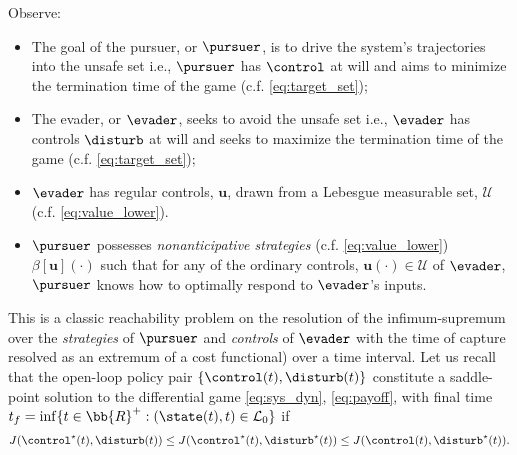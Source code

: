 Observe:
%
\begin{itemize}
	\item The goal of the pursuer, or $\pursuer$, is to drive the system's trajectories into the unsafe set i.e., $\pursuer$ has $\control$ at will and aims to minimize the termination time of the game  (c.f. \eqref{eq:target_set});
	\item The evader, or $\evader$, seeks to avoid the unsafe  set i.e., $\evader$ has controls $\disturb$ at will and seeks to maximize the termination time of the game (c.f.  \eqref{eq:target_set});
	\item $\evader$ has regular controls, $\bm{u}$, drawn from a Lebesgue measurable set, $\mathcal{U}$ (c.f. \eqref{eq:value_lower}).
	\item $\pursuer$ possesses \textit{nonanticipative strategies} (c.f. \eqref{eq:value_lower}) \ie  $\beta[\bm{u}](\cdot)$ such that for any of the ordinary controls, $\bm{u}(\cdot) \in \mathcal{U}$ of $\evader$, $\pursuer$ knows how to optimally respond to $\evader$'s inputs.
\end{itemize}
%
This is a classic reachability problem on the resolution of the infimum-supremum over the \textit{strategies} of $\pursuer$ and \textit{controls} of $\evader$ with the time of capture resolved as an extremum of a cost functional) over a time interval.%
%
%
Let us recall that the open-loop policy pair $\{\control(t), \disturb(t)\}$ constitute a saddle-point solution  to the differential game \eqref{eq:sys_dyn}, \eqref{eq:payoff}, with final time $t_f = \inf \{t \in \bb{R}^+: (\state(t), t) \in \mathcal{L}_0\}$ if 
%
\begin{align}
	J(\control^\star(t), \disturb(t)) \le J(\control^\star(t), \disturb^\star(t)) \le J(\control(t), \disturb^\star(t)).
	\label{eq:saddle_points}
\end{align}
